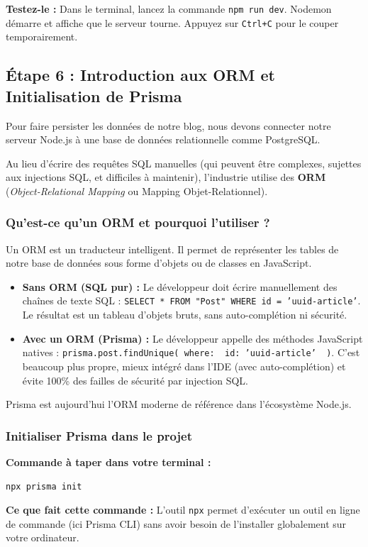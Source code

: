 \textbf{Testez-le :} Dans le terminal, lancez la commande \texttt{npm run dev}. Nodemon démarre et affiche que le serveur tourne. Appuyez sur \texttt{Ctrl+C} pour le couper temporairement.

\subsection{Étape 6 : Introduction aux ORM et Initialisation de Prisma}
Pour faire persister les données de notre blog, nous devons connecter notre serveur Node.js à une base de données relationnelle comme PostgreSQL.

Au lieu d'écrire des requêtes SQL manuelles (qui peuvent être complexes, sujettes aux injections SQL, et difficiles à maintenir), l'industrie utilise des \textbf{ORM} (\textit{Object-Relational Mapping} ou Mapping Objet-Relationnel).

\subsubsection{Qu'est-ce qu'un ORM et pourquoi l'utiliser ?}
Un ORM est un traducteur intelligent. Il permet de représenter les tables de notre base de données sous forme d'objets ou de classes en JavaScript.
\begin{itemize}
    \item \textbf{Sans ORM (SQL pur) :} Le développeur doit écrire manuellement des chaînes de texte SQL : \texttt{SELECT * FROM "Post" WHERE id = 'uuid-article'}. Le résultat est un tableau d'objets bruts, sans auto-complétion ni sécurité.
    \item \textbf{Avec un ORM (Prisma) : } Le développeur appelle des méthodes JavaScript natives : \texttt{prisma.post.findUnique({ where: { id: 'uuid-article' } })}. C'est beaucoup plus propre, mieux intégré dans l'IDE (avec auto-complétion) et évite 100\% des failles de sécurité par injection SQL.
\end{itemize}
Prisma est aujourd'hui l'ORM moderne de référence dans l'écosystème Node.js.

\subsubsection{Initialiser Prisma dans le projet}
\textbf{Commande à taper dans votre terminal :}
\begin{lstlisting}[language=bash]
npx prisma init
\end{lstlisting}
\textbf{Ce que fait cette commande :}
L'outil \texttt{npx} permet d'exécuter un outil en ligne de commande (ici Prisma CLI) sans avoir besoin de l'installer globalement sur votre ordinateur.

